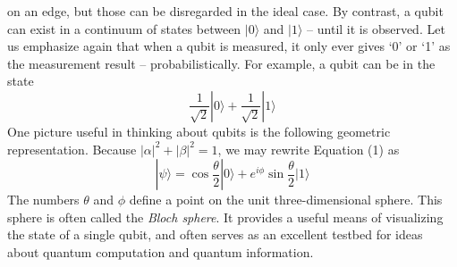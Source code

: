 \documentclass[20pt]{report}
\begin{document}
on an edge, but those can be disregarded in the ideal case. By contrast, a qubit can exist
in a continuum of states between $|0\rangle$ and $|1\rangle$ – until it is observed. Let us emphasize
again that when a qubit is measured, it only ever gives ‘0’ or ‘1’ as the measurement
result – probabilistically. For example, a qubit can be in the state
\begin{equation}
\frac{1}{\sqrt{2}}|0\rangle + \frac{1}{\sqrt{2}}|1\rangle
\end{equation}
One picture useful in thinking about qubits is the following geometric representation. Because $|\alpha|^2 + |\beta|^2 = 1$, we may rewrite Equation (1) as
\begin{equation}
|\psi\rangle = \cos{\frac{\theta}{2}}|0\rangle + e^{i\phi} \sin{\frac{\theta}{2}}|1\rangle
\end{equation}
The numbers $\theta$ and $\phi$ define a point on the unit three-dimensional sphere. This sphere is often called the \textit{Bloch sphere}. It provides a useful means of visualizing the state of a single qubit, and often serves as an excellent testbed for ideas
about quantum computation and quantum information.


\printindex{}
\end{document}
